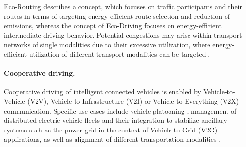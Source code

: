 \documentclass[a4paper,twoside]{article}
\begin{document}
Eco-Routing \cite{ericsson2006optimizing} describes a concept, which focuses on traffic participants and their routes in terms of targeting energy-efficient route selection and reduction of emissions, whereas the concept of Eco-Driving \cite{huang2018eco} focuses on energy-efficient intermediate driving behavior. 
Potential congestions may arise within transport networks of single modalities due to their excessive utilization, where energy-efficient utilization of different transport modalities can be targeted \cite{namoun2021eco}.

	\paragraph{Cooperative driving.}
\label{sec:cooperative-driving}

	
	Cooperative driving of intelligent connected vehicles \cite{wang2022review} %
	is enabled by Vehicle-to-Vehicle (V2V), Vehicle-to-Infrastructure (V2I) or Vehicle-to-Everything (V2X) communication. Specific use-cases include vehicle platooning \cite{jia2015survey}, management of distributed electric vehicle fleets and their integration to stabilize ancillary systems such as the power grid in the context of Vehicle-to-Grid (V2G) \cite{hu2016electric} applications, as well as alignment of different transportation modalities \cite{harris2015ict}. 
	
	
\end{document}
